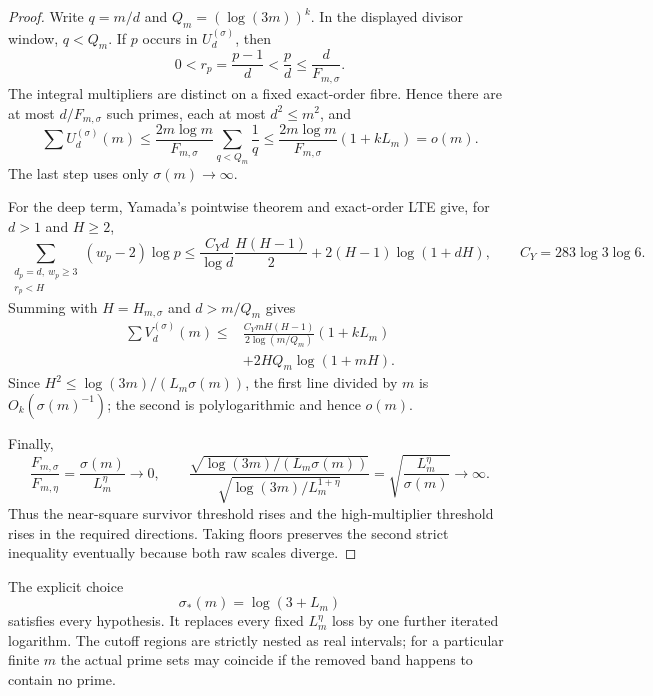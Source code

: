 \begin{proof}
Write $q=m/d$ and $Q_m=(\log(3m))^k$.  In the displayed divisor window,
$q<Q_m$.  If $p$ occurs in $U_d^{(\sigma)}$, then
\[
 0<r_p=\frac{p-1}{d}<\frac p d\le\frac d{F_{m,\sigma}}.
\]
The integral multipliers are distinct on a fixed exact-order fibre.  Hence
there are at most $d/F_{m,\sigma}$ such primes, each at most $d^2\le m^2$,
and
\begin{equation}\label{eq:slow-one-copy-bound}
 \sum U_d^{(\sigma)}(m)
 \le \frac{2m\log m}{F_{m,\sigma}}
       \sum_{q<Q_m}\frac1q
 \le \frac{2m\log m}{F_{m,\sigma}}(1+kL_m)=o(m).
\end{equation}
The last step uses only $\sigma(m)\to\infty$.

For the deep term, Yamada's pointwise theorem \cite{Yamada2010} and
exact-order LTE give, for $d>1$ and $H\ge2$,
\[
 \sum_{\substack{d_p=d,\ w_p\ge3\\r_p<H}}(w_p-2)\log p
 \le \frac{C_Yd}{\log d}\frac{H(H-1)}2
       +2(H-1)\log(1+dH),
 \qquad C_Y=283\log3\log6.
\]
Summing with $H=H_{m,\sigma}$ and $d>m/Q_m$ gives
\begin{align*}
 \sum V_d^{(\sigma)}(m)
 \le{}&\frac{C_YmH(H-1)}{2\log(m/Q_m)}(1+kL_m)\\
      &+2HQ_m\log(1+mH).
\end{align*}
Since $H^2\le\log(3m)/(L_m\sigma(m))$, the first line divided by $m$ is
$O_k(\sigma(m)^{-1})$; the second is polylogarithmic and hence $o(m)$.

Finally,
\[
 \frac{F_{m,\sigma}}{F_{m,\eta}}
   =\frac{\sigma(m)}{L_m^\eta}\longrightarrow0,
 \qquad
 \frac{\sqrt{\log(3m)/(L_m\sigma(m))}}
      {\sqrt{\log(3m)/L_m^{1+\eta}}}
   =\sqrt{\frac{L_m^\eta}{\sigma(m)}}\longrightarrow\infty.
\]
Thus the near-square survivor threshold rises and the high-multiplier
threshold rises in the required directions.  Taking floors preserves the
second strict inequality eventually because both raw scales diverge.
\end{proof}

The explicit choice
\begin{equation}\label{eq:critical-explicit-sigma}
                         \sigma_*(m)=\log(3+L_m)
\end{equation}
satisfies every hypothesis.  It replaces every fixed $L_m^\eta$ loss by one
further iterated logarithm.  The cutoff regions are strictly nested as real
intervals; for a particular finite $m$ the actual prime sets may coincide if
the removed band happens to contain no prime.

